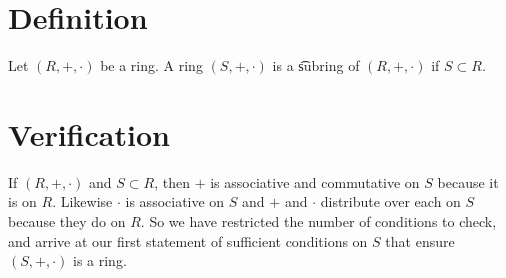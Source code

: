 

\section*{Definition}

Let $(R, +, \cdot )$ be a ring.
A ring $(S, +, \cdot )$ is a \t{subring} of $(R, +, \cdot )$ if $S \subset R$.

\section*{Verification}

If $(R, +, \cdot )$ and $S \subset R$, then $+$ is associative and commutative on $S$ because it is on $R$. Likewise $\cdot $ is associative on $S$ and $+$ and $\cdot $ distribute over each on $S$ because they do on $R$.
So we have restricted the number of conditions to check, and arrive at our first statement of sufficient conditions on $S$ that ensure $(S, +, \cdot )$ is a ring.

\blankpage